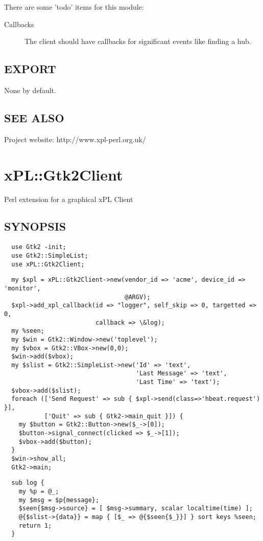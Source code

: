 \documentclass[12pt,a4paper]{article}
\begin{document}
There are some 'todo' items for this module:

\begin{description}

\item[{Callbacks}] \mbox{}

The client should have callbacks for significant events like finding a
hub.

\end{description}
\subsection*{EXPORT\label{xPL::Client_EXPORT}}


None by default.

\subsection*{SEE ALSO\label{xPL::Client_SEE_ALSO}}


Project website: http://www.xpl-perl.org.uk/

\newpage
\section{xPL::Gtk2Client\label{xPL::Gtk2Client}}


Perl extension for a graphical xPL Client

\subsection*{SYNOPSIS\label{xPL::Gtk2Client_SYNOPSIS}}
\begin{verbatim}
  use Gtk2 -init;
  use Gtk2::SimpleList;
  use xPL::Gtk2Client;
\end{verbatim}
\begin{verbatim}
  my $xpl = xPL::Gtk2Client->new(vendor_id => 'acme', device_id => 'monitor',
                                 @ARGV);
  $xpl->add_xpl_callback(id => "logger", self_skip => 0, targetted => 0,
                         callback => \&log);
  my %seen;
  my $win = Gtk2::Window->new('toplevel');
  my $vbox = Gtk2::VBox->new(0,0);
  $win->add($vbox);
  my $slist = Gtk2::SimpleList->new('Id' => 'text',
                                    'Last Message' => 'text',
                                    'Last Time' => 'text');
  $vbox->add($slist);
  foreach (['Send Request' => sub { $xpl->send(class=>'hbeat.request') }],
           ['Quit' => sub { Gtk2->main_quit }]) {
    my $button = Gtk2::Button->new($_->[0]);
    $button->signal_connect(clicked => $_->[1]);
    $vbox->add($button);
  }
  $win->show_all;
  Gtk2->main;
\end{verbatim}
\begin{verbatim}
  sub log {
    my %p = @_;
    my $msg = $p{message};
    $seen{$msg->source} = [ $msg->summary, scalar localtime(time) ];
    @{$slist->{data}} = map { [$_ => @{$seen{$_}}] } sort keys %seen;
    return 1;
  }
\end{verbatim}
\end{document}
